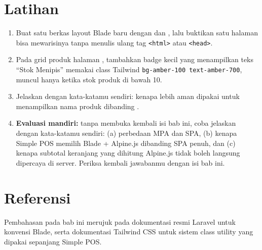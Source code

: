 \section{Latihan}

\begin{enumerate}
  \item Buat satu berkas layout Blade baru dengan  dan
    , lalu buktikan satu halaman bisa mewarisinya
    tanpa menulis ulang tag \texttt{<html>} atau \texttt{<head>}.
  \item Pada grid produk halaman , tambahkan badge kecil yang
    menampilkan teks ``Stok Menipis'' memakai class Tailwind
    \texttt{bg-amber-100 text-amber-700}, muncul hanya ketika stok produk
    di bawah 10.
  \item Jelaskan dengan kata-katamu sendiri: kenapa \cmd{\{\{ \}\}} lebih
    aman dipakai untuk menampilkan nama produk dibanding \cmd{\{!! !!\}}.
  \item \textbf{Evaluasi mandiri:} tanpa membuka kembali isi bab ini, coba
    jelaskan dengan kata-katamu sendiri: (a) perbedaan MPA dan SPA, (b)
    kenapa Simple POS memilih Blade + Alpine.js dibanding SPA penuh, dan
    (c) kenapa subtotal keranjang yang dihitung Alpine.js tidak boleh
    langsung dipercaya di server. Periksa kembali jawabanmu dengan isi bab
    ini.
\end{enumerate}

\section{Referensi}

Pembahasan pada bab ini merujuk pada dokumentasi resmi Laravel
\cite{laraveldocs} untuk konvensi Blade, serta dokumentasi Tailwind CSS
\cite{tailwinddocs} untuk sistem class utility yang dipakai sepanjang
Simple POS.
